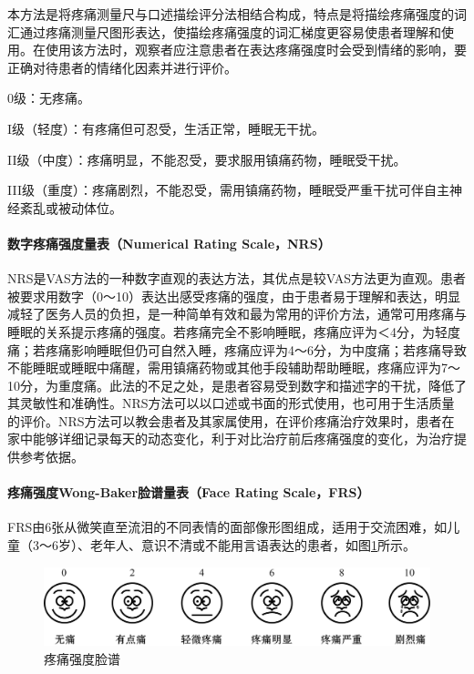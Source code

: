 本方法是将疼痛测量尺与口述描绘评分法相结合构成，特点是将描绘疼痛强度的词汇通过疼痛测量尺图形表达，使描绘疼痛强度的词汇梯度更容易使患者理解和使用。在使用该方法时，观察者应注意患者在表达疼痛强度时会受到情绪的影响，要正确对待患者的情绪化因素并进行评价。

0级：无疼痛。

I级（轻度）：有疼痛但可忍受，生活正常，睡眠无干扰。

II级（中度）：疼痛明显，不能忍受，要求服用镇痛药物，睡眠受干扰。

III级（重度）：疼痛剧烈，不能忍受，需用镇痛药物，睡眠受严重干扰可伴自主神经紊乱或被动体位。
\paragraph{数字疼痛强度量表（Numerical Rating Scale，NRS）}

NRS是VAS方法的一种数字直观的表达方法，其优点是较VAS方法更为直观。患者被要求用数字（0～10）表达出感受疼痛的强度，由于患者易于理解和表达，明显减轻了医务人员的负担，是一种简单有效和最为常用的评价方法，通常可用疼痛与睡眠的关系提示疼痛的强度。若疼痛完全不影响睡眠，疼痛应评为＜4分，为轻度痛；若疼痛影响睡眠但仍可自然入睡，疼痛应评为4～6分，为中度痛；若疼痛导致不能睡眠或睡眠中痛醒，需用镇痛药物或其他手段辅助帮助睡眠，疼痛应评为7～10分，为重度痛。此法的不足之处，是患者容易受到数字和描述字的干扰，降低了其灵敏性和准确性。NRS方法可以以口述或书面的形式使用，也可用于生活质量的评价。NRS方法可以教会患者及其家属使用，在评价疼痛治疗效果时，患者在家中能够详细记录每天的动态变化，利于对比治疗前后疼痛强度的变化，为治疗提供参考依据。
\paragraph{疼痛强度Wong-Baker脸谱量表（Face Rating Scale，FRS）}

FRS由6张从微笑直至流泪的不同表情的面部像形图组成，适用于交流困难，如儿童（3～6岁）、老年人、意识不清或不能用言语表达的患者，如图\ref{fig20-1}所示。

\begin{figure}[!htbp]
 \centering
 \includegraphics[width=.7\textwidth]{./images/Image00025.jpg}
 \captionsetup{justification=centering}
 \caption{疼痛强度脸谱}
 \label{fig20-1}
  \end{figure} 

